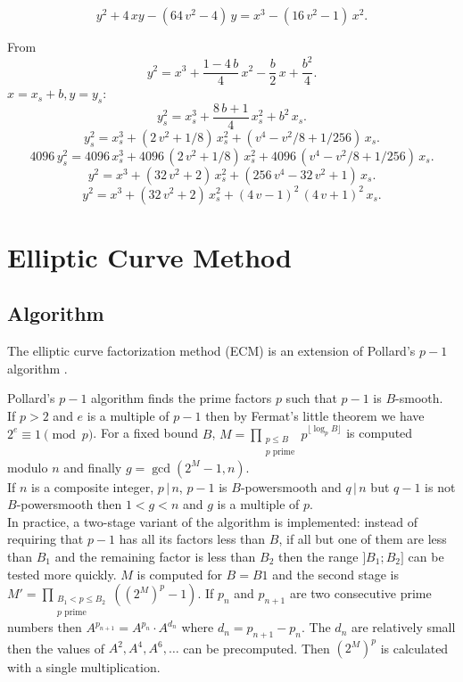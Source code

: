 \documentclass[a4paper, 11pt, pdftex]{report}
\theoremstyle{plain}
\theoremstyle{definition}
\begin{document}
$$y^2 + 4\, x y - (64\,v^2 - 4)\,y = x^3 - (16\,v^2 - 1)\, x^2.$$

From
$$y^2 = x^3 + \frac{1 - 4\,b}{4}\, x^2 - \frac{b}{2}\, x + \frac{b^2}{4}.$$
$x = x_s + b, y = y_s$:
$$y_s^2 = x_s^3 + \frac{8\,b + 1}{4}\, x_s^2 + b^2\, x_s.$$
$$y_s^2 = x_s^3 + (2\,v^2 + 1/8)\, x_s^2 + (v^4 - v^2/8 + 1/256)\, x_s.$$
$$4096\,y_s^2 = 4096\,x_s^3 + 4096\,(2\,v^2 + 1/8)\, x_s^2 + 4096\,(v^4 - v^2/8 + 1/256)\, x_s.$$
$$y^2 = x^3 + (32\,v^2 + 2)\, x_s^2 + (256\,v^4 - 32\,v^2 + 1)\, x_s.$$
$$y^2 = x^3 + (32\,v^2 + 2)\, x_s^2 + (4\,v - 1)^2\, (4\,v + 1)^2\, x_s.$$

\fi

\chapter{Elliptic Curve Method}

\section{Algorithm}

The elliptic curve factorization method (ECM) is an extension of Pollard's $p - 1$ algorithm
\cite{Pollard1}.

Pollard's $p - 1$ algorithm finds the prime factors $p$ such that $p - 1$ is $B$-smooth.\\
If $p > 2$ and $e$ is a multiple of $p - 1$ then by Fermat's little theorem we have
$2^e \equiv 1  \pmod{p}$. For a fixed bound $B$,
$M = \prod_{\substack{p \le B\\ p \text{ prime}}} p^{ \lfloor \log_p{B} \rfloor }$
is computed modulo $n$ and finally $g = \gcd(2^M - 1, n)$.\\ If $n$ is a composite integer,
$p\, |\, n$, $p - 1$ is $B$-powersmooth and $q\, |\, n$ but $q - 1$ is not $B$-powersmooth
then $ 1 < g < n$ and $g$ is a multiple of $p$.\\
In practice, a two-stage variant of the algorithm is implemented: instead of requiring that
$p - 1$ has all its factors less than $B$, if all but one of them are less than $B_1$ and
the remaining factor is less than $B_2$ then the range $]B_1; B_2]$ can be tested more quickly.
$M$ is computed for $B = B1$ and the second stage is
$M' = \prod_{\substack{B_1 < p \le B_2\\ p \text{ prime}}} \left((2^M)^p - 1 \right)$.
If $p_n$ and $p_{n+1}$ are two consecutive prime numbers then $A^{p_{n+1}} = A^{p_n} \cdot A^{d_n}$
where $d_n = p_{n+1} - p_n$. The $d_n$ are relatively small then the values of $A^2, A^4, A^6, \ldots$
can be precomputed. Then $\left(2^M \right)^p$ is calculated with a single multiplication. 
\end{document}
